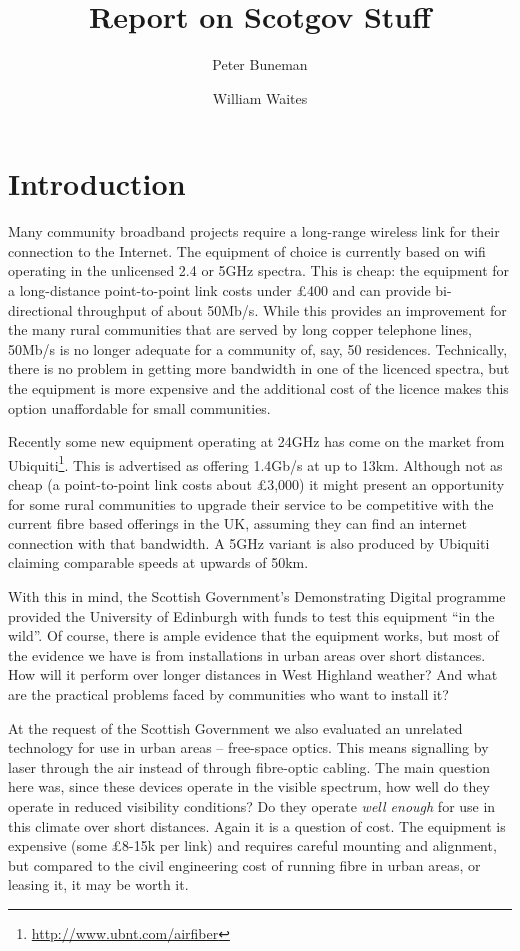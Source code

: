 \documentclass{amsart}
\title{Report on Scotgov Stuff}
\author{Peter Buneman \and William Waites}
\begin{document}
\maketitle
\tableofcontents

\section{Introduction}\label{introduction}

Many community broadband projects require a long-range wireless link
for their connection to the Internet. The equipment of choice is
currently based on wifi operating in the unlicensed 2.4 or 5GHz
spectra. This is cheap: the equipment for a long-distance
point-to-point link costs under \pounds 400 and can provide
bi-directional throughput of about 50Mb/s. While this provides an
improvement for the many rural communities that are served by long
copper telephone lines, 50Mb/s is no longer adequate for a community
of, say, 50 residences. Technically, there is no problem in getting
more bandwidth in one of the licenced spectra, but the equipment is
more expensive and the additional cost of the licence makes this
option unaffordable for small communities.

Recently some new equipment operating at 24GHz has come on the market
from Ubiquiti\footnote{\href{http://www.ubnt.com/airfiber}{\url{http://www.ubnt.com/airfiber}}}.
This is advertised as offering 1.4Gb/s at up to 13km. Although not as
cheap (a point-to-point link costs about \pounds 3,000) it might present
an opportunity for some rural communities to upgrade their service to
be competitive with the current fibre based offerings in the UK,
assuming they can find an internet connection with that bandwidth. A
5GHz variant is also produced by Ubiquiti claiming comparable speeds
at upwards of 50km.

With this in mind, the Scottish Government's Demonstrating
Digital programme provided the University of Edinburgh with funds to
test this equipment ``in the wild''. Of course, there is ample evidence
that the equipment works, but most of the evidence we have is
from installations in urban areas over short distances. How will
it perform over longer distances in West Highland weather? And what
are the practical problems faced by communities who want to install it?

At the request of the Scottish Government we also evaluated an
unrelated technology for use in urban areas -- free-space optics. This
means signalling by laser through the air instead of through
fibre-optic cabling. The main question here was, since these devices
operate in the visible spectrum, how well do they operate in reduced
visibility conditions? Do they operate \emph{well enough} for use in
this climate over short distances. Again it is a question of cost. The
equipment is expensive (some \pounds 8-15k per link) and requires
careful mounting and alignment, but compared to the civil engineering
cost of running fibre in urban areas, or leasing it, it may be worth
it.



\end{document}
